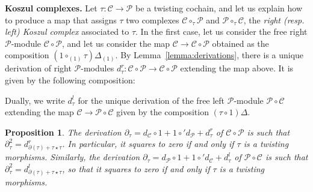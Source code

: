 \documentclass[fleqn, a4paper, twoside]{article}
\makeatletter
\newcommand{\0}{\langle 0\rangle}
\let\[\@undefined
\DeclareRobustCommand{\[}{\begin{equation}}%
\let\]\@undefined
\DeclareRobustCommand{\]}{\end{equation}}%
\theoremstyle{mytheorem}
\newtheorem{proposition}[theorem]{Proposition}
\theoremstyle{introthm}
\theoremstyle{mydefinition}
\theoremstyle{mydefinition2}
\theoremstyle{plain} %
\newcommand{\CC}{\mathcal{C}}
\newcommand{\?}{\,?\,}
\newcommand{\PP}{{\mathcal{P}}}
\theoremstyle{mytheorem}
\theoremstyle{plain} %
\makeatother
\begin{document}
\textbf{Koszul complexes.}
Let $\tau : \CC\longrightarrow \PP$ be a twisting cochain,
and let us explain how to produce a map that assigns $\tau$
two complexes $\CC\circ_\tau \PP$ and $\PP\circ_\tau\CC$, 
the \emph{right (resp. left) Koszul complex} associated to $\tau$.
In the first case, let us consider the free right $\PP$-module
$\CC\circ \PP$, and let us consider the map
$\CC \longrightarrow \CC\circ \PP$
obtained as the composition $(1\circ_{(1)} \tau)\Delta_{(1)}$.
By Lemma~\ref{lemma:derivations}, there is a unique derivation
of right $\PP$-modules
$d_\tau^r : \CC\circ \PP \longrightarrow \CC\circ \PP$
extending the map above. It is given by the following composition:
\[
 \]
Dually, we write $d_\tau^l$ for the unique derivation of the free left 
$\PP$-module $\PP\circ\CC$ extending the map $\CC\longrightarrow \PP\circ \CC$
given by the composition $(\tau\circ 1)\Delta$. 


\begin{proposition}
The derivation $\partial_\tau = d_\CC\circ 1  + 1\circ' d_\PP + d_\tau^r$
of $\CC\circ \PP$
is such that $\partial_\tau^2 = d_{\partial(\tau) + \tau\star\tau}^r$. In 
particular, it squares to zero if and only if $\tau$ is a twisting
morphisms. Similarly, the derivation  $\partial_\tau = d_\PP\circ 1  + 1\circ' 
d_\CC + d_\tau^l$ of $\PP\circ \CC$ is such that 
$\partial_\tau^2 = d_{\partial(\tau) + \tau\star\tau}^l$,
so that it squares to zero if and only if $\tau$ is a twisting
morphisms.
\end{proposition}
\end{document}

